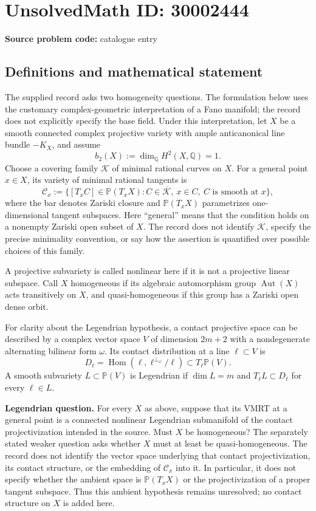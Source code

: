 \documentclass[11pt]{article}
\newcommand{\Q}{\mathbb{Q}}
\newcommand{\PP}{\mathbb{P}}
\begin{document}
\section*{UnsolvedMath ID: 30002444}
\textbf{Source problem code:} catalogue entry
\subsection{Definitions and mathematical statement}
The supplied record asks two homogeneity questions. The formulation below uses the customary complex-geometric interpretation of a Fano manifold; the record does not explicitly specify the base field. Under this interpretation, let \(X\) be a smooth connected complex projective variety with ample anticanonical line bundle \(-K_X\), and assume
\[
 b_2(X):=\dim_{\Q}H^2(X,\Q)=1.
\]
Choose a covering family \(\mathcal K\) of minimal rational curves on \(X\). For a general point \(x\in X\), its variety of minimal rational tangents is
\[
 \mathcal C_x:=\overline{\{[T_xC]\in\PP(T_xX): C\in\mathcal K,\ x\in C,\ C\text{ is smooth at }x\}},
\]
where the bar denotes Zariski closure and \(\PP(T_xX)\) parametrizes one-dimensional tangent subspaces. Here ``general'' means that the condition holds on a nonempty Zariski open subset of \(X\). The record does not identify \(\mathcal K\), specify the precise minimality convention, or say how the assertion is quantified over possible choices of this family.

A projective subvariety is called nonlinear here if it is not a projective linear subspace. Call \(X\) homogeneous if its algebraic automorphism group \(\operatorname{Aut}(X)\) acts transitively on \(X\), and quasi-homogeneous if this group has a Zariski open dense orbit.

For clarity about the Legendrian hypothesis, a contact projective space can be described by a complex vector space \(V\) of dimension \(2m+2\) with a nondegenerate alternating bilinear form \(\omega\). Its contact distribution at a line \(\ell\subset V\) is
\[
 D_{\ell}=\operatorname{Hom}(\ell,\ell^{\perp_\omega}/\ell)
 \subset T_{\ell}\PP(V).
\]
A smooth subvariety \(L\subset\PP(V)\) is Legendrian if \(\dim L=m\) and \(T_{\ell}L\subset D_{\ell}\) for every \(\ell\in L\).

\textbf{Legendrian question.} For every \(X\) as above, suppose that its VMRT at a general point is a connected nonlinear Legendrian submanifold of the contact projectivization intended in the source. Must \(X\) be homogeneous? The separately stated weaker question asks whether \(X\) must at least be quasi-homogeneous. The record does not identify the vector space underlying that contact projectivization, its contact structure, or the embedding of \(\mathcal C_x\) into it. In particular, it does not specify whether the ambient space is \(\PP(T_xX)\) or the projectivization of a proper tangent subspace. Thus this ambient hypothesis remains unresolved; no contact structure on \(X\) is added here.
\end{document}

